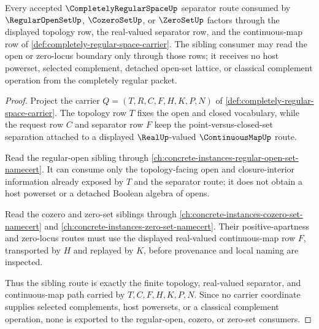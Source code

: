 \begin{theorem}
\label{thm:completely-regular-space-regular-open-sibling-route}
Every accepted $\CompletelyRegularSpaceUp$ separator route consumed by $\RegularOpenSetUp$, $\CozeroSetUp$, or $\ZeroSetUp$ factors through the displayed topology row, the real-valued separator row, and the continuous-map row of \autoref{def:completely-regular-space-carrier}. The sibling consumer may read the open or zero-locus boundary only through those rows; it receives no host powerset, selected complement, detached open-set lattice, or classical complement operation from the completely regular packet.
\end{theorem}
\begin{proof}
Project the carrier $Q=(T,R,C,F,H,K,P,N)$ of \autoref{def:completely-regular-space-carrier}. The topology row $T$ fixes the open and closed vocabulary, while the request row $C$ and separator row $F$ keep the point-versus-closed-set separation attached to a displayed $\RealUp$-valued $\ContinuousMapUp$ route.

Read the regular-open sibling through \autoref{ch:concrete-instances-regular-open-set-namecert}. It can consume only the topology-facing open and closure-interior information already exposed by $T$ and the separator route; it does not obtain a host powerset or a detached Boolean algebra of opens.

Read the cozero and zero-set siblings through \autoref{ch:concrete-instances-cozero-set-namecert} and \autoref{ch:concrete-instances-zero-set-namecert}. Their positive-apartness and zero-locus routes must use the displayed real-valued continuous-map row $F$, transported by $H$ and replayed by $K$, before provenance and local naming are inspected.

Thus the sibling route is exactly the finite topology, real-valued separator, and continuous-map path carried by $T,C,F,H,K,P,N$. Since no carrier coordinate supplies selected complements, host powersets, or a classical complement operation, none is exported to the regular-open, cozero, or zero-set consumers.
\end{proof}
